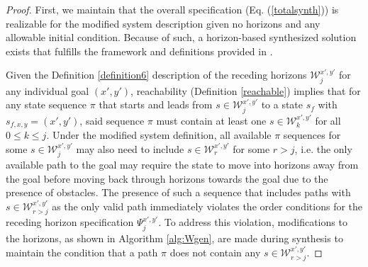 \documentclass{ieeeaccess}
\begin{document}
\begin{proof}
	First, we maintain that the overall specification (Eq. (\ref{totalsynth})) is realizable for the modified system description given no horizons and any allowable initial condition. Because of such, a horizon-based synthesized solution exists that fulfills the framework and definitions provided in \cite{c10}. 
	
	
	
	Given the Definition \ref{definition6} description of the receding horizons $\mathcal{W}^{x',y'}_j$ for any individual goal $(x',y')$, reachability (Definition \ref{reachable}) implies that for any state sequence $\pi$ that starts and leads from $s \in \mathcal{W}^{x',y'}_j$ to a state $s_f$ with $s_{f,x,y} = (x',y')$, said sequence $\pi$ must contain at least one $s \in \mathcal{W}^{x',y'}_k$ for all $0 \le k \le j$. Under the modified system definition, all available $\pi$ sequences for some $s \in \mathcal{W}^{x',y'}_j$ may also need to include $s \in \mathcal{W}^{x',y'}_r$ for some $r > j$, i.e. the only available path to the goal may require the state to move into horizons away from the goal before moving back through horizons towards the goal due to the presence of obstacles. The presence of such a sequence that includes paths with $s \in \mathcal{W}^{x',y'}_{r > j}$ as the only valid path immediately violates the order conditions for the receding horizon specification $\Psi_{j}^{x',y'}$. To address this violation, modifications to the horizons, as shown in Algorithm \ref{alg:Wgen}, are made during synthesis to maintain the condition that a path $\pi$ does not contain any $s \in \mathcal{W}^{x',y'}_{r > j}$.			
	

\end{proof}
\end{document}
